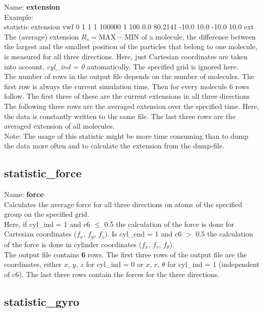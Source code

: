 Name: {\bfseries extension}
\\[2ex]
Example:
\\[0.5ex]
statistic       extension vwf 0 1 1 1 100000 1 100 0.0 80.2141 -10.0 10.0 -10.0 10.0 ext
\\[2ex]
The (average) extension $R_s = \mathrm{MAX} - \mathrm{MIN}$ of a molecule, the difference between the largest and the smallest position of the particles that belong to one molecule, is measured for all three directions.
Here, just Cartesian coordinates are taken into account, \textit{cyl\_ind = 0} automatically.
The specified grid is ignored here.
\\[2ex]
The number of rows in the output file depends on the number of molecules.
The first row is always the current simulation time.
Then for every molecule 6 rows follow.
The first three of these are the current extensions in all three directions
The following three rows are the averaged extension over the specified time.
Here, the data is constantly written to the same file.
The last three rows are the averaged extension of all molecules.
\\[2ex]
Note: The usage of this statistic might be more time consuming than to dump the data more often and to calculate the extension from the dump-file.


\subsection{statistic\_force}

Name: {\bfseries force}
\\[2ex]
Calculates the average force for all three directions on atoms of the specified group on the specified grid.
\\[2ex]
Here, if cyl\_ind = 1 and c6 $\le$ 0.5 the calculation of the force is done for Cartesian coordinates ($f_x$, $f_y$, $f_z$).
Is cyl\_end = 1 and c6 $>$ 0.5 the calculation of the force is done in cylinder coordinates ($f_x$, $f_r$, $f_{\theta}$).
\\[2ex]
The output file contains {\bfseries 6} rows.
The first three rows of the output file are the coordinates, either $x$, $y$, $z$ for cyl\_ind = 0 or $x$, $r$, $\theta$ for cyl\_ind = 1 (independent of c6).
The last three rows contain the forces for the three directions.


\subsection{statistic\_gyro}

